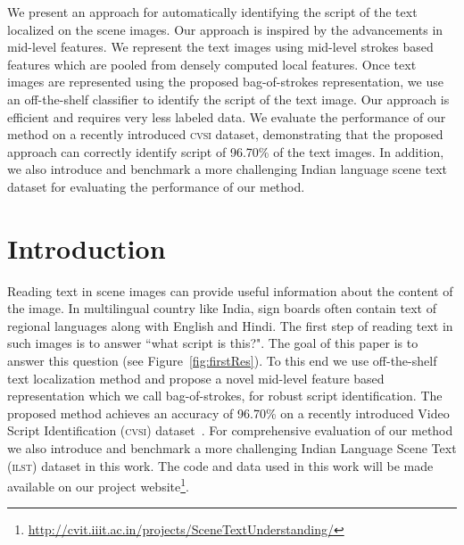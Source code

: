 We present an approach for automatically identifying the script of the text localized
on the scene images. Our approach is inspired by the advancements in mid-level features.
We represent the text images using mid-level strokes based features which are pooled from
densely computed local features. Once text images are represented using the proposed bag-of-strokes representation, we use an off-the-shelf classifier to identify the script of the text image. Our approach is efficient and requires very less labeled data. We evaluate the performance of our method on a recently introduced \textsc{cvsi} dataset, demonstrating that the proposed approach can correctly identify script of 96.70\% of the text images. In addition, we also introduce and benchmark a more challenging Indian language scene text dataset for evaluating the performance of
our method.
\section{Introduction}
Reading text in scene images can provide useful information about the content
of the image. In multilingual country like India, sign boards often contain text of regional languages along with English and Hindi. The first step of reading text in such images is to answer ``what script is this?". The goal of this paper is to answer this question (see Figure~\ref{fig:firstRes}). To this end we use off-the-shelf text localization method and propose a novel mid-level feature based representation which we call bag-of-strokes, for robust script identification. The proposed method achieves an accuracy of 96.70\% on a recently introduced Video Script Identification (\textsc{cvsi}) dataset~\cite{CVSIComp}. For comprehensive evaluation of our method we also introduce and benchmark a more challenging 
Indian Language Scene Text (\textsc{ilst}) dataset in this work. The code and data used in this work will be made available on our project website\footnote{\url{http://cvit.iiit.ac.in/projects/SceneTextUnderstanding/}}.
 
